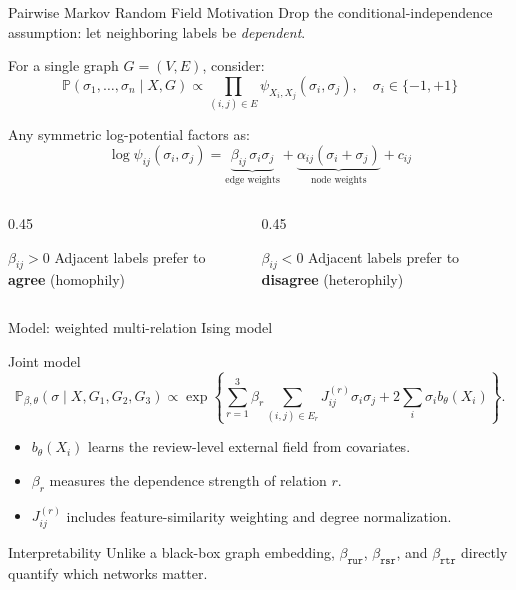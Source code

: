 \documentclass[10pt]{beamer}
\newcommand{\Pbb}{\mathbb P}
\begin{document}
\begin{frame}{Pairwise Markov Random Field Motivation}
  Drop the conditional-independence assumption: let neighboring labels be \emph{dependent}.

  \vspace{0.5em}
  For a single graph $G=(V,E)$, consider:
  \[
    \mathbb{P}(\sigma_1,\ldots,\sigma_n \mid X, G)
    \propto
    \prod_{(i,j)\in E} \psi_{X_i, X_j}(\sigma_i, \sigma_j),
    \quad \sigma_i \in \{-1, +1\}
  \]

  \vspace{0.3em}
  Any symmetric log-potential factors as:
  \[
    \log \psi_{ij}(\sigma_i,\sigma_j)
    = \underbrace{\beta_{ij}\,\sigma_i\sigma_j}_{\text{edge weights}} + \underbrace{\alpha_{ij}(\sigma_i+\sigma_j)}_{\text{node weights}} + c_{ij}
  \]

  \begin{columns}[T]
    \begin{column}{0.45\textwidth}
      \begin{block}{$\beta_{ij} > 0$}
        Adjacent labels prefer to \textbf{agree} (homophily)
      \end{block}
    \end{column}
    \begin{column}{0.45\textwidth}
      \begin{block}{$\beta_{ij} < 0$}
        Adjacent labels prefer to \textbf{disagree} (heterophily)
      \end{block}
    \end{column}
  \end{columns}
\end{frame}

\begin{frame}{Model: weighted multi-relation Ising model}

\begin{block}{Joint model}
\[
\Pbb_{\beta,\theta}(\sigma\mid X,G_1,G_2,G_3)
\propto
\exp\left\{
\sum_{r=1}^3 \beta_r \sum_{(i,j) \in E_r}J_{ij}^{(r)}\sigma_i\sigma_j
+2\sum_i \sigma_i b_\theta(X_i)
\right\}.
\]
\end{block}

\vspace{-0.2em}
\begin{itemize}
    \item $b_\theta(X_i)$ learns the review-level external field from covariates.
    \item $\beta_r$ measures the dependence strength of relation $r$.
    \item $J_{ij}^{(r)}$ includes feature-similarity weighting and degree normalization.
\end{itemize}

\vspace{0.2em}
\begin{alertblock}{Interpretability}
Unlike a black-box graph embedding, $\beta_{\texttt{rur}}$, $\beta_{\texttt{rsr}}$, and $\beta_{\texttt{rtr}}$ directly quantify which networks matter.
\end{alertblock}
\end{frame}
\end{document}

